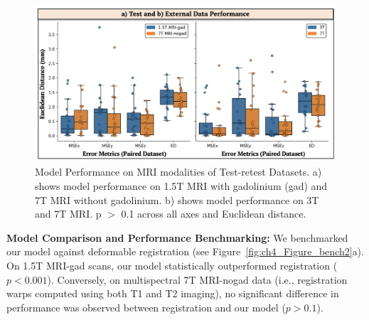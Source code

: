 \begin{figure}[hbt!]
    \centering
    \includegraphics[width=1\linewidth]{figs/ch4_Figure_errs2.png}
    \caption{Model Performance on MRI modalities of Test-retest Datasets. a) shows model performance on 1.5T MRI with gadolinium (gad) and 7T MRI without gadolinium. b) shows model performance on 3T and 7T MRI. p \(>\) 0.1 across all axes and Euclidean distance. }
    \label{fig:ch4_Figure_errs}
\end{figure}

\textbf{Model Comparison and Performance Benchmarking:} We benchmarked our model against deformable registration (see Figure~\ref{fig:ch4_Figure_bench2}a). On 1.5T MRI-gad scans, our model statistically outperformed registration ($p < 0.001$). Conversely, on multispectral 7T MRI-nogad data (i.e., registration warps computed using both T1 and T2 imaging), no significant difference in performance was observed between registration and our model ($p > 0.1$).

